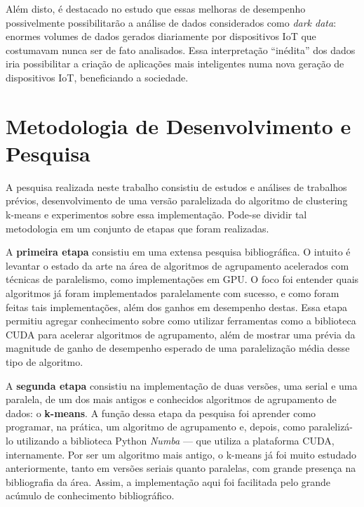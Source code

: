 \documentclass[12pt,
openright, 
oneside, %
a4paper,    %
brazil]{facom-ufu-abntex2}
\begin{document}
Além disto, é destacado no estudo que essas melhoras de desempenho possivelmente possibilitarão a análise de dados considerados como \textit{dark data}: enormes volumes de dados gerados diariamente por dispositivos IoT que costumavam nunca ser de fato analisados. Essa interpretação \enquote{inédita} dos dados iria possibilitar a criação de aplicações mais inteligentes numa nova geração de dispositivos IoT, beneficiando a sociedade.





\chapter{Metodologia de Desenvolvimento e Pesquisa}
\label{chp:metodologia}



A pesquisa realizada neste trabalho consistiu de estudos e análises de trabalhos prévios, desenvolvimento de uma versão paralelizada do algoritmo de clustering k-means e experimentos sobre essa implementação. Pode-se dividir tal metodologia em um conjunto de etapas que foram realizadas.

A \textbf{primeira etapa} consistiu em uma extensa pesquisa bibliográfica. O intuito é levantar o estado da arte na área de algoritmos de agrupamento acelerados com técnicas de paralelismo, como implementações em GPU. O foco foi entender quais algoritmos já foram implementados paralelamente com sucesso, e como foram feitas tais implementações, além dos ganhos em desempenho destas. Essa etapa permitiu agregar conhecimento sobre como utilizar ferramentas como a biblioteca CUDA para acelerar algoritmos de agrupamento, além de mostrar uma prévia da magnitude de ganho de desempenho esperado de uma paralelização média desse tipo de algoritmo.

A \textbf{segunda etapa} consistiu na implementação de duas versões, uma serial e uma paralela, de um dos mais antigos e conhecidos algoritmos de agrupamento de dados: o \textbf{k-means}. A função dessa etapa da pesquisa foi aprender como programar, na prática, um algoritmo de agrupamento e, depois, como paralelizá-lo utilizando a biblioteca Python \textit{Numba} --- que utiliza a plataforma CUDA, internamente. Por ser um algoritmo mais antigo, o k-means já foi muito estudado anteriormente, tanto em versões seriais quanto paralelas, com grande presença na bibliografia da área. Assim, a implementação aqui foi facilitada pelo grande acúmulo de conhecimento bibliográfico. %
\end{document}
